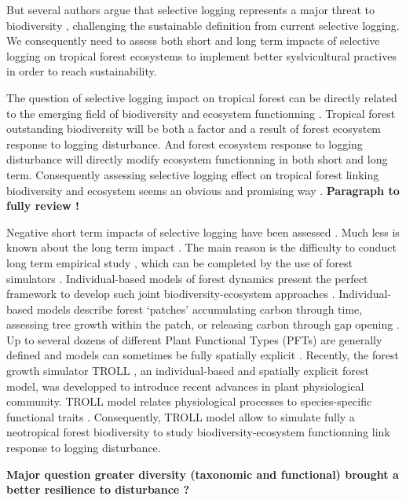 \documentclass[12pt,]{article}
\theoremstyle{definition}
\theoremstyle{definition}
\theoremstyle{remark}
\begin{document}
But several authors argue that selective logging represents a major
threat to biodiversity
\citep{Carreno-Rocabado2012, DeAvila2015, Gibson2013, Martin2015, Zimmerman2012},
challenging the sustainable definition from current selective logging.
We consequently need to assess both short and long term impacts of
selective logging on tropical forest ecosystems to implement better
syslvicultural practives in order to reach sustainability.

The question of selective logging impact on tropical forest can be
directly related to the emerging field of biodiversity and ecosystem
functionning \citep{Loreau2000}. Tropical forest outstanding
biodiversity will be both a factor and a result of forest ecosystem
response to logging disturbance. And forest ecosystem response to
logging disturbance will directly modify ecosystem functionning in both
short and long term. Consequently assessing selective logging effect on
tropical forest linking biodiversity and ecosystem seems an obvious and
promising way \citep{Loreau2010}. \textbf{Paragraph to fully review !}

Negative short term impacts of selective logging have been assessed
\citetext{\citealp{Carreno-Rocabado2012}; \citealp{DeAvila2015}; \citealp[but
see][]{Martin2015}}. Much less is known about the long term impact
\citep{Osazuwa-Peters2015}. The main reason is the difficulty to conduct
long term empirical study \citep[but see][]{Herault2010}, which can be
completed by the use of forest simulators
\citep{Huth2004, Khler2004, Ruger2008, Tietjen2006}. Individual-based
models of forest dynamics present the perfect framework to develop such
joint biodiversity-ecosystem approaches \citep{Li}. Individual-based
models describe forest `patches' accumulating carbon through time,
assessing tree growth within the patch, or releasing carbon through gap
opening \citep{Bugmann2001}. Up to several dozens of different Plant
Functional Types (PFTs) are generally defined and models can sometimes
be fully spatially explicit \citep{Pacala1996}. Recently, the forest
growth simulator TROLL \citep{Chave1999}, an individual-based and
spatially explicit forest model, was developped to introduce recent
advances in plant physiological community. TROLL model relates
physiological processes to species-specific functional traits
\citep{Li}. Consequently, TROLL model allow to simulate fully a
neotropical forest biodiversity to study biodiversity-ecosystem
functionning link response to logging disturbance.

\textbf{Major question greater diversity (taxonomic and functional)
brought a better resilience to disturbance ?}
\end{document}
